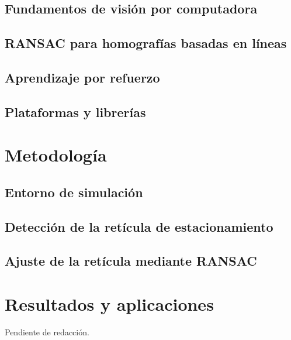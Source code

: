 \documentclass[10pt,letterpaper,final]{report}
\newlength{\spacing}
\newcommand{\nspace}[1]{\setlength{\baselineskip}{#1\spacing}}
\newenvironment{linespacing}[1]{\nspace{#1}}{}
\begin{document}
\begin{linespacing}{1.5}
\section{Fundamentos de visión por computadora}\label{sec:vision}


\section{RANSAC para homografías basadas en líneas}\label{sec:ransac-teorico}


\section{Aprendizaje por refuerzo}


\section{Plataformas y librerías}\label{sec:plataformas}


\clearpage
\chapter{Metodología}\label{chap:metodologia}


\section{Entorno de simulación}\label{sec:carla}


\section{Detección de la retícula de estacionamiento}\label{sec:metodo-reticula}


\section{Ajuste de la retícula mediante RANSAC}\label{sec:metodo-ransac}


\clearpage
\chapter{Resultados y aplicaciones}
Pendiente de redacción.

\end{linespacing}
\end{document}
